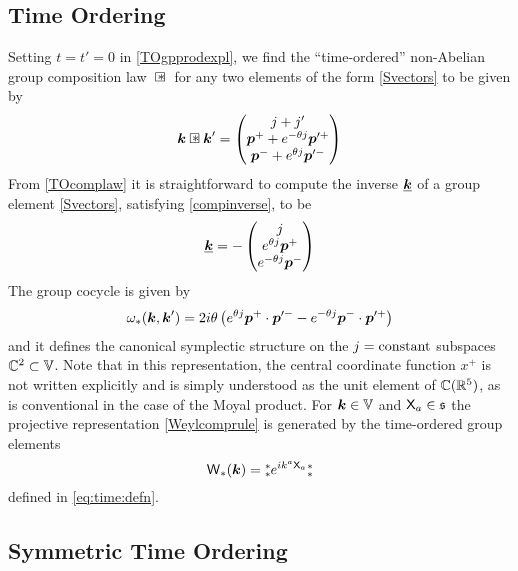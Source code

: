 \subsection{Time Ordering}
\label{TOPGWS}
Setting $t=t'=0$ in \eqref{TOgpprodexpl}, we find the ``time-ordered''
non-Abelian group composition law $\compa$ for any two elements of the
form \eqref{Svectors} to be given by
\begin{equation}
  \label{TOcomplaw}
  \mk\compa\mk'=\begin{pmatrix}j+j' \\\mbp^++ e^{-\theta j} 
    \mbp^{\prime +} \\\mbp^-+ e^{\theta j} \mbp^{\prime -}
  \end{pmatrix}
\end{equation}
From \eqref{TOcomplaw} it is straightforward to compute the inverse
$\underline{{{\boldsymbol {k} }}}$ of a group element \eqref{Svectors}, satisfying
\eqref{compinverse}, to be
\begin{equation}
  \label{TOinverse}
  \underline{{{\boldsymbol {k} }}}=-\begin{pmatrix}j\\ e^{\theta j} {{\boldsymbol {p} }}^+\\
    e^{-\theta j} {{\boldsymbol {p} }}^- \end{pmatrix}
\end{equation}
The group cocycle is given by
\begin{equation}
  \label{TOcocycle}
  \omega_*({{\boldsymbol {k} }},{{\boldsymbol {k} }}' )=2 i\theta \left( e^{\theta j} 
    {{\boldsymbol {p} }}^+\cdot{{\boldsymbol {p} }}^{\prime -}- e^{-\theta j} 
    {{\boldsymbol {p} }}^-\cdot{{\boldsymbol {p} }}^{\prime +}\right)
\end{equation}
and it defines the canonical symplectic structure on the $j={\rm constant}$
subspaces ${\mathbb C}^2\subset\mathbb{V}$. Note that in this representation, the
central coordinate function $x^+$ is not written explicitly and is simply
understood as the unit element of ${\mathbb C}({\mathbb R}^5)$, as is conventional in the
case of the Moyal product. For ${{\boldsymbol {k} }}\in\mathbb{V}$ and ${\sf X}_a\in{\mathfrak s}$ the
projective representation \eqref{Weylcomprule} is generated by the time-ordered
group elements
\begin{equation}
  \label{TOweylop}
  \operatorname{{\sf W}}_*({{\boldsymbol {k} }})=\mbox{$\substack{\ast\\\ast}$}  e^{ i k^a {\sf X}_a} \mbox{$\substack{\ast\\\ast}$}
\end{equation}
defined in \eqref{eq:time:defn}.

\subsection{Symmetric Time Ordering}
\label{TSOPGWS}

